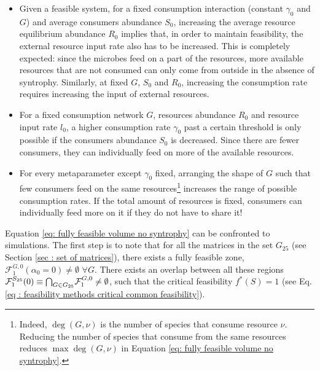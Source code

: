 \documentclass[12pt, titlepage]{report}
\begin{document}
\begin{itemize}
\item Given a feasible system, for a fixed consumption interaction (\ie constant $\gamma_0$ and $G$) and average consumers abundance $S_0$, increasing the average resource equilibrium abundance $R_0$ implies that, in order to maintain feasibility, the external resource input rate also has to be increased. This is completely expected: since the microbes feed on a part of the resources, more available resources that are not consumed can only come from outside in the absence of syntrophy. Similarly, at fixed $G$, $S_0$ and $R_0$, increasing the consumption rate requires increasing the input of external resources.

\item For a fixed consumption network $G$, resources abundance $R_0$ and resource input rate $l_0$, a higher consumption rate $\gamma_0$ past a certain threshold is only possible if the consumers abundance $S_0$ is decreased. Since there are fewer consumers, they can individually feed on more of the available resources.
\item For every metaparameter except $\gamma_0$ fixed, arranging the shape of $G$ such that few consumers feed on the same resources\footnote{Indeed, $\deg(G,\nu)$ is the number of species that consume resource $\nu$. Reducing the number of species that consume from the same resources reduces $\max{\deg(G,\nu)}$ in Equation \eqref{eq: fully feasible volume no syntrophy}.} increases the range of possible consumption rates. If the total amount of resources is fixed, consumers can individually feed more on it if they do not have to share it!
\end{itemize}
Equation \eqref{eq: fully feasible volume no syntrophy} can be confronted to simulations.
The first step is to note that for all the matrices in the set $G_{25}$ (see Section \ref{sec : set of matrices}), there exists a fully feasible zone, \ie $\mathcal{F}^{G, 0}_1(\alpha_0=0) \neq \emptyset$ $ \forall G$. There exists an overlap between all these regions $\mathcal{F}_1^{S_{25}}(0) \equiv {\bigcap}_{G \in G_{25}} \mathcal{F}^{G,0}_1 \neq \emptyset$, such that the critical feasibility $f^*(S)=1$ (see Eq.\eqref{eq : feasibility methods critical common feasibility}).
\end{document}
